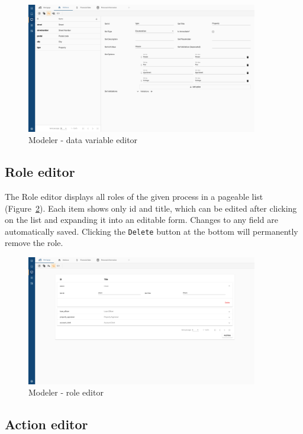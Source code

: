\begin{figure}[h!]
  \centering
  \includegraphics[width=0.9\textwidth]{images/modeler_data_editor.png}
  \caption{Modeler - data variable editor}
  \label{fig:modeler_data_editor}
\end{figure}

\subsection{Role editor}\label{subsec:role-editor}

The Role editor displays all roles of the given process in a pageable list (Figure~\ref{fig:modeler_role_editor}).
Each item shows only id and title, which can be edited after clicking on the list and expanding it into an editable form.
Changes to any field are automatically saved.
Clicking the \texttt{Delete} button at the bottom will permanently remove the role.

\begin{figure}[h!]
  \centering
  \includegraphics[width=0.9\textwidth]{images/modeler_role_editor.png}
  \caption{Modeler - role editor}
  \label{fig:modeler_role_editor}
\end{figure}

\subsection{Action editor}\label{subsec:action-editor}

